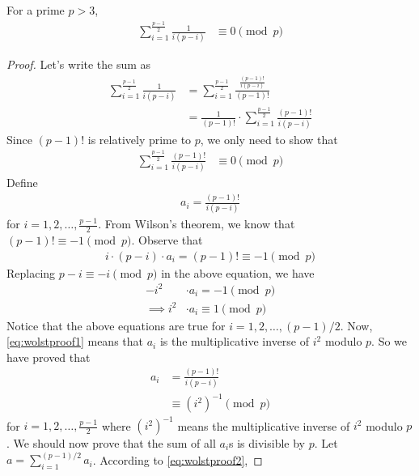 	\begin{lemma}\label{lem:wolstproof4}
		For a prime $p>3$,
			\begin{align*}
				\sum_{i=1}^{\frac{p-1}{2}} \frac{1}{i(p-i)}
					& \equiv 0 \pmod p
			\end{align*}
	\end{lemma}

	\begin{proof}
		Let's write the sum as
			\begin{align*}
				\sum_{i=1}^{\frac{p-1}{2}} \frac{1}{i(p-i)}
					& = \sum_{i=1}^{\frac{p-1}{2}} \frac{\frac{(p-1)!}{i(p-i)}}{(p-1)!}\\
					& = \frac{1}{(p-1)!} \cdot \sum_{i=1}^{\frac{p-1}{2}} \frac{(p-1)!}{i(p-i)}
			\end{align*}
		Since $(p-1)!$ is relatively prime to $p$, we only need to show that
			\begin{align*}
				\sum_{i=1}^{\frac{p-1}{2}} \frac{(p-1)!}{i(p-i)}
					& \equiv 0 \pmod p
			\end{align*}
		Define
			\begin{align*}
				a_i = \frac{(p-1)!}{i(p-i)}
			\end{align*}
		for $i=1,2,\ldots,\frac{p-1}{2}$. From Wilson's theorem, we know that $(p-1)! \equiv -1 \pmod p$. Observe that
			\begin{align*}
				i\cdot (p-i) \cdot a_i = (p-1)! \equiv -1 \pmod p
			\end{align*}
		Replacing $p-i \equiv -i \pmod p$ in the above equation, we have
			\begin{align}\label{eq:wolstproof1}
				-i^2
					& \cdot a_i = -1 \pmod p\\
				\implies i^2
					& \cdot a_i \equiv 1 \pmod p
			\end{align}
		Notice that the above equations are true for $i=1,2,\ldots,(p-1)/2$. Now, \eqref{eq:wolstproof1} means that $a_i$ is the multiplicative inverse of $i^2$ modulo $p$. So we have proved that
			\begin{align}\label{eq:wolstproof2}
				a_i
					& = \frac{(p-1)!}{i(p-i)}\\
					& \equiv (i^2)^{-1} \pmod p
			\end{align}
		for $i=1,2,\ldots,\frac{p-1}{2}$ where $(i^2)^{-1}$ means the multiplicative inverse of $i^2$ modulo $p$. We should now prove that the sum of all $a_i$s is divisible by $p$. Let $ a=\sum_{i=1}^{(p-1)/2} a_i$. According to \eqref{eq:wolstproof2},

\end{proof}
